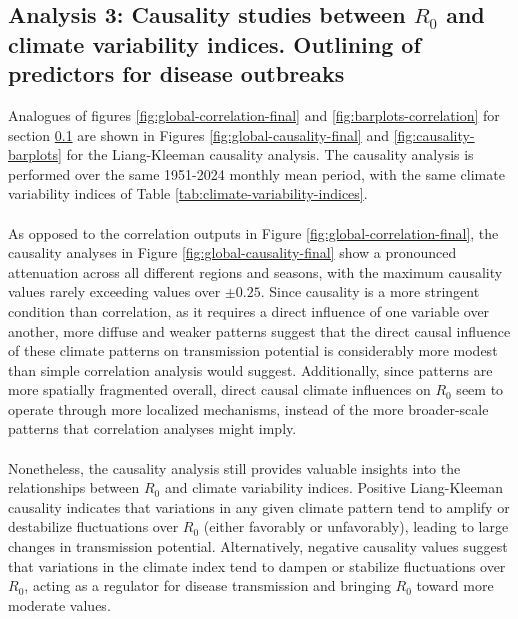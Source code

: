 \documentclass[10pt,twocolumn]{wlscirep}
\begin{document}
\subsection{Analysis 3: Causality studies between $R_0$ and climate variability indices. Outlining of predictors for disease outbreaks} \label{sec-results-3}

Analogues of figures \ref{fig:global-correlation-final} and \ref{fig:barplots-correlation} for section \ref{sec-results-3} are shown in Figures \ref{fig:global-causality-final} and \ref{fig:causality-barplots} for the Liang-Kleeman causality analysis. The causality analysis is performed over the same 1951-2024 monthly mean period, with the same climate variability indices of Table \ref{tab:climate-variability-indices}.
\\
\\
As opposed to the correlation outputs in Figure \ref{fig:global-correlation-final}, the causality analyses in Figure \ref{fig:global-causality-final} show a pronounced attenuation across all different regions and seasons, with the maximum causality values rarely exceeding values over $\pm0.25$. Since causality is a more stringent condition than correlation, as it requires a direct influence of one variable over another, more diffuse and weaker patterns suggest that the direct causal influence of these climate patterns on transmission potential is considerably more modest than simple correlation analysis would suggest. Additionally, since patterns are more spatially fragmented overall, direct causal climate influences on $R_0$ seem to operate through more localized mechanisms, instead of the more broader-scale patterns that correlation analyses might imply.
\\
\\
Nonetheless, the causality analysis still provides valuable insights into the relationships between $R_0$ and climate variability indices. Positive Liang-Kleeman causality indicates that variations in any given climate pattern tend to amplify or destabilize fluctuations over $R_0$ (either favorably or unfavorably), leading to large changes in transmission potential. Alternatively, negative causality values suggest that variations in the climate index tend to dampen or stabilize fluctuations over $R_0$, acting as a regulator for disease transmission and bringing $R_0$ toward more moderate values.
\\
\\
\end{document}
